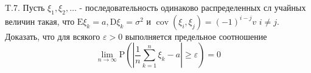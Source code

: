 \documentclass[a4paper,12pt]{article} %
\begin{document}
\begin{example}

T.7. Пусть $\xi_{1}, \xi_{2}, \ldots$ - последовательность одинаково распределенных сл учайных величин такая, что $\mathrm{E} \xi_{k}=a, \mathrm{D} \xi_{k}=\sigma^{2}$ и $\operatorname{cov}\left(\xi_{i}, \xi_{j}\right)=(-1)^{i-j} v$
$i \neq j .$ 
Доказать, что для всякого $\varepsilon>0$ выполняется предельное соотношение
$$
\lim _{n \rightarrow \infty} \mathrm{P}\left(\left|\frac{1}{n} \sum_{k=1}^{n} \xi_{k}-a\right| \geq \varepsilon\right)=0
$$













\end{example}
\end{document}
